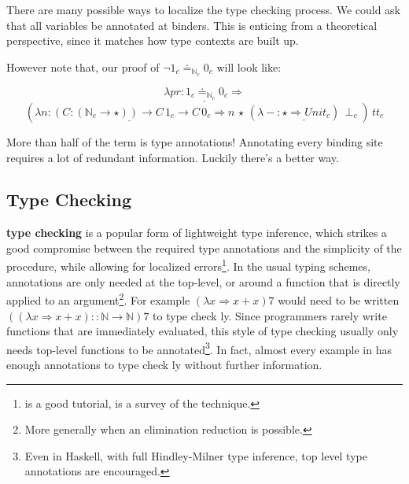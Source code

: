\section{\Bidir{} \SLang{}}
 
There are many possible ways to localize the type checking process.
We could ask that all variables be annotated at binders.
This is enticing from a theoretical perspective, since it matches how type contexts are built up.
 
However note that, our proof of $\lnot1_{c}\doteq_{\mathbb{N}_{c}}0_{c}$ will look like:

\[
\lambda pr\underline{:1_{c}\doteq_{\mathbb{N}_{c}}0_{c}}\Rightarrow
\]
\[
\left(\lambda n \underline{:\left(C:\left(\mathbb{N}_{c}\rightarrow\star\right)\right)\rightarrow C\,1_{c}\rightarrow C\,0_{c}}\Rightarrow n\,\star\,(\lambda - \underline{:\star\Rightarrow Unit_{c}})\,\perp_{c}\right)\,tt_{c}
\]

More than half of the term is type annotations!
Annotating every binding site requires a lot of redundant information.
Luckily there's a better way.
 
\subsection{\Bidir{} Type Checking}
 
\textbf{\Bidir{} type checking} is a popular form of lightweight type inference, which strikes a good compromise between the required type annotations and the simplicity of the procedure, while allowing for localized errors\footnote{
  \cite{christiansen2013bidirectional} is a good tutorial, \cite{10.1145/3450952} is a survey of the technique.
}.
In the usual \bidir{} typing schemes, annotations are only needed at the top-level, or around a function that is directly applied to an argument\footnote{
  More generally when an elimination reduction is possible.
}.
For example $(\lambda x\Rightarrow x+x)7$ would need to be written $\left((\lambda x\Rightarrow x+x)::\mathbb{N}\rightarrow\mathbb{N}\right)7$ to type check \bidir{}ly.
Since programmers rarely write functions that are immediately evaluated, this style of type checking usually only needs top-level functions to be annotated\footnote{
  Even in Haskell, with full Hindley-Milner type inference, top level type annotations are encouraged.
}.
In fact, almost every example in  has enough annotations to type check \bidir{}ly without further information.
 
